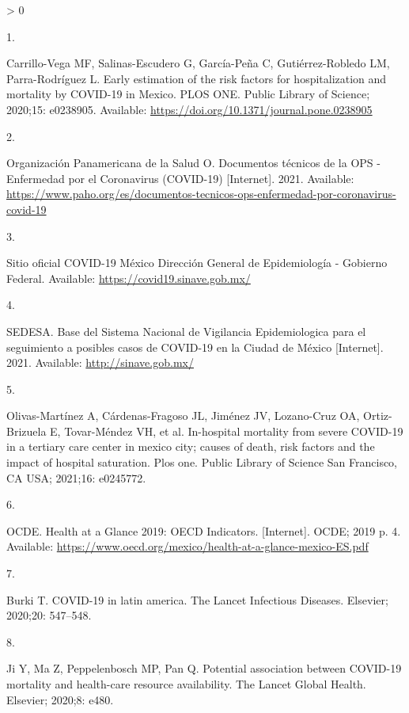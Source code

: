 \documentclass[10pt,letterpaper]{article}
\newlength{\csllabelwidth}
\newlength{\cslhangindent}
\newenvironment{CSLReferences}[2] %
 {%
  \setlength{\parindent}{0pt}
  \ifodd #1 \everypar{\setlength{\hangindent}{\cslhangindent}}\ignorespaces\fi
  \ifnum #2 > 0
  \setlength{\parskip}{#2\baselineskip}
  \fi
 }%
 {}
\newcommand{\CSLLeftMargin}[1]{\parbox[t]{\csllabelwidth}{#1}}
\newcommand{\CSLRightInline}[1]{\parbox[t]{\linewidth - \csllabelwidth}{#1}\break}
\begin{document}
\hypertarget{refs}{}
\begin{CSLReferences}{0}{0}
\leavevmode\hypertarget{ref-Carrillo-Vega2020}{}%
\CSLLeftMargin{1. }
\CSLRightInline{Carrillo-Vega MF, Salinas-Escudero G, García-Peña C,
Gutiérrez-Robledo LM, Parra-Rodríguez L. {Early estimation of the risk
factors for hospitalization and mortality by COVID-19 in Mexico}. PLOS
ONE. Public Library of Science; 2020;15: e0238905. Available:
\url{https://doi.org/10.1371/journal.pone.0238905}}

\leavevmode\hypertarget{ref-OrganizacionPanamericanadelaSalud2021}{}%
\CSLLeftMargin{2. }
\CSLRightInline{Organización Panamericana de la Salud O. {Documentos
t{é}cnicos de la OPS - Enfermedad por el Coronavirus (COVID-19)}
{[}Internet{]}. 2021. Available:
\url{https://www.paho.org/es/documentos-tecnicos-ops-enfermedad-por-coronavirus-covid-19}}

\leavevmode\hypertarget{ref-covidgob}{}%
\CSLLeftMargin{3. }
\CSLRightInline{Sitio oficial COVID-19 M{é}xico Direcci{ó}n General de
Epidemiolog{í}a - Gobierno Federal. Available:
\url{https://covid19.sinave.gob.mx/}}

\leavevmode\hypertarget{ref-SEDESA2021}{}%
\CSLLeftMargin{4. }
\CSLRightInline{SEDESA. {Base del Sistema Nacional de Vigilancia
Epidemiologica para el seguimiento a posibles casos de COVID-19 en la
Ciudad de M{é}xico} {[}Internet{]}. 2021. Available:
\url{http://sinave.gob.mx/}}

\leavevmode\hypertarget{ref-olivas2021hospital}{}%
\CSLLeftMargin{5. }
\CSLRightInline{Olivas-Martínez A, Cárdenas-Fragoso JL, Jiménez JV,
Lozano-Cruz OA, Ortiz-Brizuela E, Tovar-Méndez VH, et al. In-hospital
mortality from severe COVID-19 in a tertiary care center in mexico city;
causes of death, risk factors and the impact of hospital saturation.
Plos one. Public Library of Science San Francisco, CA USA; 2021;16:
e0245772. }

\leavevmode\hypertarget{ref-OCDE2019}{}%
\CSLLeftMargin{6. }
\CSLRightInline{OCDE. {Health at a Glance 2019: OECD Indicators.}
{[}Internet{]}. OCDE; 2019 p. 4. Available:
\url{https://www.oecd.org/mexico/health-at-a-glance-mexico-ES.pdf}}

\leavevmode\hypertarget{ref-burki2020covid}{}%
\CSLLeftMargin{7. }
\CSLRightInline{Burki T. COVID-19 in latin america. The Lancet
Infectious Diseases. Elsevier; 2020;20: 547--548. }

\leavevmode\hypertarget{ref-ji2020potential}{}%
\CSLLeftMargin{8. }
\CSLRightInline{Ji Y, Ma Z, Peppelenbosch MP, Pan Q. Potential
association between COVID-19 mortality and health-care resource
availability. The Lancet Global Health. Elsevier; 2020;8: e480. }


\end{CSLReferences}
\end{document}
